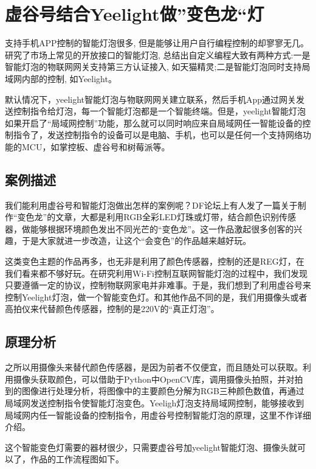 \documentclass[letterpaper,10pt,english]{sphinxmanual}
\begin{document}
\section{虚谷号结合Yeelight做”变色龙“灯}
\label{\detokenize{09.case/9.1-yeelight:yeelight}}\label{\detokenize{09.case/9.1-yeelight::doc}}
支持手机APP控制的智能灯泡很多, 但是能够让用户自行编程控制的却寥寥无几。研究了市场上常见的开放接口的智能灯泡, 总结出自定义编程大致有两种方式:一是智能灯泡的物联网网关支持第三方认证接入, 如天猫精灵;二是智能灯泡同时支持局域网内部的控制, 如Yeelight。

默认情况下，yeelight智能灯泡与物联网网关建立联系，然后手机App通过网关发送控制指令给灯泡，每一个智能灯泡都是一个智能终端。但是，yeelight智能灯泡如果开启了“局域网控制”功能，那么就可以同时响应来自局域网任一智能设备的控制指令了，发送控制指令的设备可以是电脑、手机，也可以是任何一个支持网络功能的MCU，如掌控板、虚谷号和树莓派等。


\subsection{案例描述}
\label{\detokenize{09.case/9.1-yeelight:id1}}
我们能利用虚谷号和智能灯泡做出怎样的案例呢？DF论坛上有人发了一篇关于制作“变色龙”的文章，大都是利用RGB全彩LED灯珠或灯带，结合颜色识别传感器，做能够根据环境颜色发出不同光芒的“变色龙”。这一作品激起很多创客的兴趣，于是大家就进一步改造，让这个“会变色”的作品越来越好玩。

这类变色主题的作品再多，也无非是利用了颜色传感器，控制的还是REG灯，在我们看来都不够好玩。在研究利用Wi-Fi控制互联网智能灯泡的过程中，我们发现只要遵循一定的协议，控制物联网家电并非难事。于是，我们想到了利用虚谷号来控制Yeelight灯泡，做一个智能变色灯。和其他作品不同的是，我们用摄像头或者高拍仪来代替颜色传感器，控制的是220V的“真正灯泡”。


\subsection{原理分析}
\label{\detokenize{09.case/9.1-yeelight:id2}}
之所以用摄像头来替代颜色传感器，是因为前者不仅便宜，而且随处可以获取。利用摄像头获取颜色，可以借助于Python中OpenCV库，调用摄像头拍照，并对拍到的图像进行处理分析，将图像中的主要颜色分解为RGB三种颜色数值，再通过局域网发送控制指令使智能灯泡变色。Yeeligh灯泡支持局域网控制，能够接收到局域网内任一智能设备的控制指令，用虚谷号控制智能灯泡的原理，这里不作详细介绍。

这个智能变色灯需要的器材很少，只需要虚谷号加yeelight智能灯泡、摄像头就可以了，作品的工作流程图如下。
\end{document}
